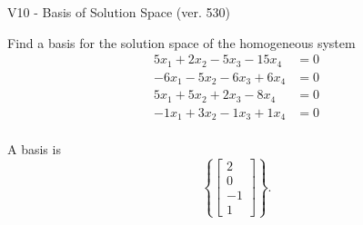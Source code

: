 \begin{exercise}
  \begin{exerciseTitle}V10 - Basis of Solution Space (ver. 530)\end{exerciseTitle}
  \begin{exerciseStatement}
    Find a basis for the solution space of the homogeneous system 
\begin{align*}
 5 x_ 1 + 2 x_ 2 -5 x_ 3 -15 x_ 4 &= 0  \\ 
  -6 x_ 1 -5 x_ 2 -6 x_ 3 + 6 x_ 4 &= 0  \\ 
  5 x_ 1 + 5 x_ 2 + 2 x_ 3 -8 x_ 4 &= 0  \\ 
  -1 x_ 1 + 3 x_ 2 -1 x_ 3 + 1 x_ 4 &= 0  \\ 
 \end{align*}


 
  \end{exerciseStatement}

  \begin{exerciseAnswer}
   A basis is   
\[\left\{\left[\begin{array}{c}
2 \\
0 \\
-1 \\
1
\end{array}\right]\right\}.\]

  


  \end{exerciseAnswer}
\end{exercise}